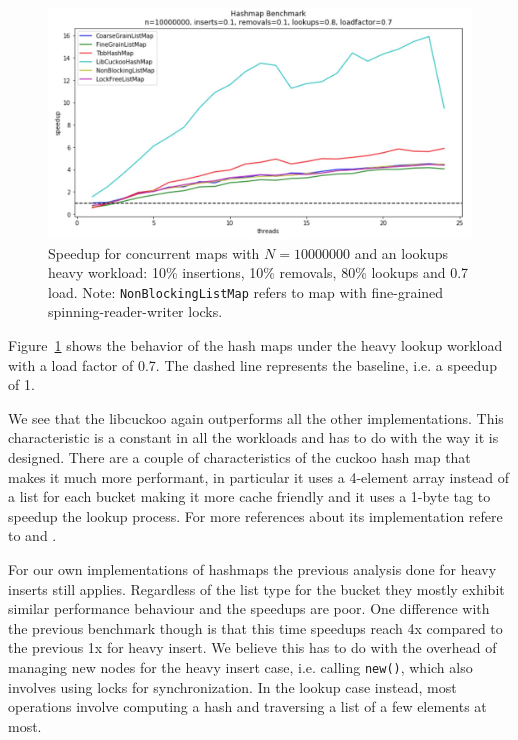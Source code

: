 \documentclass[11pt]{article}
\begin{document}
\begin{figure}[!htb]
\centering
\includegraphics[width=1.0\linewidth]{figs/patricio/latedays/lookups_heavy.jpg}
\caption{
Speedup for concurrent maps with $N=10000000$ and an lookups heavy workload:
10\% insertions, 10\% removals, 80\% lookups and 0.7 load. Note:
{\tt NonBlockingListMap} refers to map with fine-grained spinning-reader-writer locks.}
\label{fig:mapLookupsHeavy}
\end{figure}

Figure~\ref{fig:mapLookupsHeavy} shows the behavior of the hash maps under the
heavy lookup workload with a load factor of 0.7. The dashed line represents
the baseline, i.e. a speedup of 1.

We see that the libcuckoo again outperforms all the other implementations. This characteristic
is a constant in all the workloads and has to do with the way it is designed. There are a
couple of characteristics of the cuckoo hash map that makes it much more performant, in particular
it uses a 4-element array instead of a list for each bucket making it more cache friendly and
it uses a 1-byte tag to speedup the lookup process. For more references about its implementation refere
to \cite{Andersen} and \cite{Andersen2}.

For our own implementations of hashmaps the previous analysis done for heavy
inserts still applies. Regardless of the list type for the bucket they mostly exhibit similar
performance behaviour and the speedups are poor. One difference with the
previous benchmark though is that this time speedups reach 4x compared to the previous 1x for
heavy insert. We believe this has to do with the overhead of managing new nodes for the heavy
insert case, i.e. calling {\tt new()}, which also involves using locks for synchronization.
In the lookup case instead, most operations involve computing a hash and traversing a list of a
few elements at most.
\end{document}
